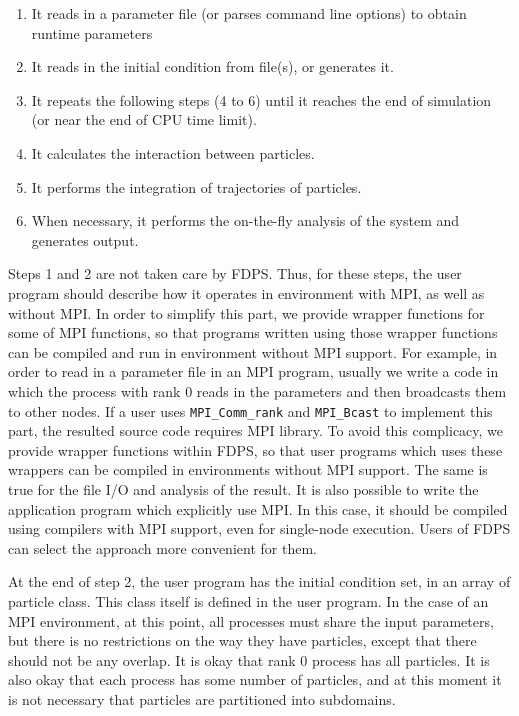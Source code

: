 \documentclass[dvipdfmx]{acm_proc_article-sp}
\begin{document}
\begin{enumerate}

  \item It reads in a parameter file (or parses command line options)
    to obtain runtime parameters
  \item It reads in the initial condition from file(s), or generates
    it.
  \item It repeats the following steps (4 to 6) until it reaches the end of
    simulation (or near the end of CPU time limit).
  \item It calculates the interaction between particles.
  \item It performs the integration of trajectories of particles.
  \item When necessary, it performs the on-the-fly analysis of the
    system and generates output.
\end{enumerate}

Steps 1 and 2 are not taken care by FDPS. Thus, for these steps, the
user program should describe how it operates in environment with MPI,
as well as without MPI.  In order to simplify this part, we provide
wrapper functions for some of MPI functions, so that programs written
using those wrapper functions can be compiled and run in environment
without MPI support. For example, in order to read in a parameter file
in an MPI program, usually we write a code in which the process with
rank 0 reads in the parameters and then broadcasts them to other
nodes. If a user uses {\tt MPI\_Comm\_rank} and 
 {\tt MPI\_Bcast} to implement this part, the
resulted source code requires MPI library. To avoid this complicacy,
we provide wrapper functions within FDPS, so that user programs which
uses these wrappers can be compiled in environments without MPI
support. The same is true for the file I/O and analysis of the result.
It is also possible to write the application program which explicitly
use MPI. In this case, it should be compiled using compilers with MPI
support, even for single-node execution. Users of FDPS can select the
approach more convenient for them.

At the end of step 2, the user program has the initial condition
set, in an array of particle class. This class itself is defined in
the user program. In the case of an MPI environment, at this point, all
processes must share the input parameters, but there is no
restrictions on the way they have particles, except that there should
not be any overlap. It is okay that rank 0 process has all
particles. It is also okay that each process has some number of
particles, and at this moment it is not necessary that particles are
partitioned into subdomains.
\end{document}
